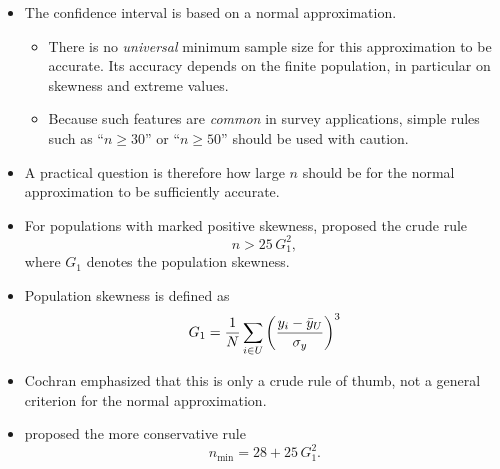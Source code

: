 \documentclass{my_eth_beamer}
\numberwithin{equation}{section}
\begin{document}
\begin{frame}
    \begin{itemize}
    \setlength{\itemsep}{8pt}
        \item The confidence interval is based on a \alert{normal
            approximation}.
        \vspace{0.25em}
            \begin{itemize}
            \setlength{\itemsep}{6pt}
                \item There is no \emph{universal} minimum sample size for this
                    approximation to be accurate. Its accuracy depends on the
                    finite population, in particular on skewness and extreme
                    values.
                \item Because such features are \emph{common} in survey
                    applications, simple rules such as ``$n \geq 30$'' or
                    ``$n \geq 50$'' should be used with caution.
            \end{itemize}
        \item A \alert{practical question} is therefore how large $n$ should be
            for the normal approximation to be sufficiently accurate.
        \item For populations with marked \alert{positive skewness},
            \citet[][p.~42]{cochran_1977} proposed the \alert{crude rule}
            \begin{equation*}
                n > 25\,G_1^2,
            \end{equation*}
            where $G_1$ denotes the population skewness.
    \end{itemize}
\end{frame}

\begin{frame}
    \begin{itemize}
    \setlength{\itemsep}{12pt}
        \item Population skewness is defined as
            \begin{equation*}
                G_1 = \frac{1}{N} \sum_{i \in U} \left(\frac{y_i -
                \bar{y}_U}{\sigma_y}\right)^3
            \end{equation*}
        \item Cochran emphasized that this is only a \alert{crude rule of
            thumb}, not a general criterion for the normal approximation.
        \item \citet{sugden_smith_etal_2000} proposed the more conservative rule
            \begin{equation*}
                n_{\min} = 28 + 25\,G_1^2.
            \end{equation*}
    \end{itemize}
\end{frame}
\end{document}

